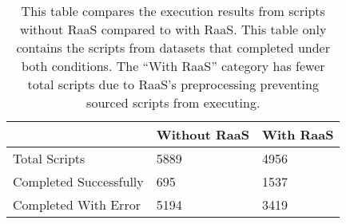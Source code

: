 \begin{table}
\centering
\caption{This table compares the execution results from scripts without RaaS compared to with RaaS. This table only contains the scripts from datasets that completed under both conditions. The ``With RaaS'' category has fewer total scripts due to RaaS's preprocessing preventing sourced scripts from executing.}
\label{tab:pre-post}
\begin{tabular}{lll}
\toprule
{} & Without RaaS & With RaaS \\
\midrule
Total Scripts          &         5889 &      4956 \\ \hline
Completed Successfully &          695 &      1537 \\ \hline
Completed With Error   &         5194 &      3419 \\
\bottomrule
\end{tabular}
\end{table}
